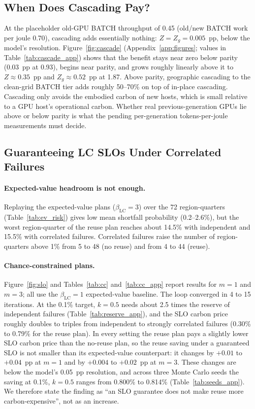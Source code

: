 \documentclass{article} %
\begin{document}
\subsection{When Does Cascading Pay?}
\label{sec:cascade}
At the placeholder old-GPU BATCH throughput of 0.45 (old/new BATCH work per joule 0.70), cascading adds essentially nothing: $Z = Z_g = 0.005$~pp, below the model's resolution. Figure~\ref{fig:cascade} (Appendix~\ref{app:figures}; values in Table~\ref{tab:cascade_app}) shows that the benefit stays near zero below parity (0.03~pp at 0.93), begins near parity, and grows roughly linearly above it to $Z \approx 0.35$~pp and $Z_g \approx 0.52$~pp at 1.87. Above parity, geographic cascading to the clean-grid BATCH tier adds roughly 50--70\% on top of in-place cascading. Cascading only avoids the embodied carbon of new hosts, which is small relative to a GPU host's operational carbon. Whether real previous-generation GPUs lie above or below parity is what the pending per-generation tokens-per-joule measurements must decide.

\subsection{Guaranteeing LC SLOs Under Correlated Failures}
\label{sec:slo}
\paragraph{Expected-value headroom is not enough.} Replaying the expected-value plans ($\beta_{\text{LC}}=3$) over the 72 region-quarters (Table~\ref{tab:ev_risk}) gives low mean shortfall probability (0.2--2.6\%), but the worst region-quarter of the reuse plan reaches about 14.5\% with independent and 15.5\% with correlated failures. Correlated failures raise the number of region-quarters above 1\% from 5 to 48 (no reuse) and from 4 to 44 (reuse).

\paragraph{Chance-constrained plans.} Figure~\ref{fig:slo} and Tables~\ref{tab:cc} and~\ref{tab:cc_app} report results for $m=1$ and $m=3$; all use the $\beta_{\text{LC}}=1$ expected-value baseline. The loop converged in 4 to 15 iterations. At the 0.1\% target, $k=0.5$ needs about 2.5 times the reserve of independent failures (Table~\ref{tab:reserve_app}), and the SLO carbon price roughly doubles to triples from independent to strongly correlated failures (0.30\% to 0.79\% for the reuse plan). In every setting the reuse plan pays a slightly lower SLO carbon price than the no-reuse plan, so the reuse saving under a guaranteed SLO is not smaller than its expected-value counterpart: it changes by $+0.01$ to $+0.04$~pp at $m=1$ and by $+0.004$ to $+0.02$~pp at $m=3$. These changes are below the model's 0.05~pp resolution, and across three Monte Carlo seeds the saving at 0.1\%, $k=0.5$ ranges from 0.800\% to 0.814\% (Table~\ref{tab:seeds_app}). We therefore state the finding as ``an SLO guarantee does not make reuse more carbon-expensive'', not as an increase.
\end{document}
